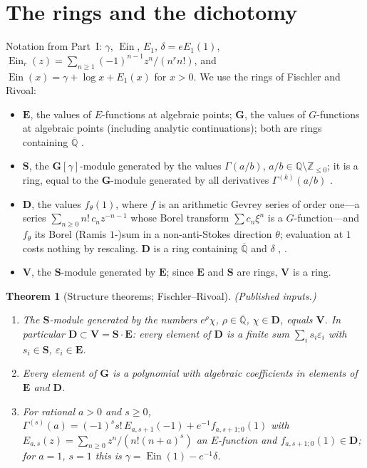 \documentclass[11pt,a4paper]{article}
\newcommand{\Q}{\mathbb Q}
\newcommand{\Z}{\mathbb Z}
\newcommand{\Qbar}{\overline{\mathbb Q}}
\newcommand{\Ein}{\operatorname{Ein}}
\newcommand{\EE}{\mathbf E}
\newcommand{\GG}{\mathbf G}
\newcommand{\DD}{\mathbf D}
\newcommand{\Sring}{\mathbf S}
\newcommand{\Vring}{\mathbf V}
\newtheorem{theorem}{Theorem}[section]
\theoremstyle{definition}
\theoremstyle{remark}
\numberwithin{equation}{section}
\begin{document}
\section{The rings and the dichotomy}\label{II:sec:setup}

Notation from Part~I: $\gamma$, $\Ein$, $E_1$, $\delta=eE_1(1)$,
$\Ein_r(z)=\sum_{n\ge1}(-1)^{n-1}z^n/(n^rn!)$, and
$\Ein(x)=\gamma+\log x+E_1(x)$ for $x>0$. We use the rings of Fischler and Rivoal:
\begin{itemize}[leftmargin=*]
\item $\EE$, the values of $E$-functions at algebraic points; $\GG$, the values of
$G$-functions at algebraic points (including analytic continuations); both are rings
containing $\Qbar$ \cite{FR2016,FR2014}.
\item $\Sring$, the $\GG[\gamma]$-module generated by the values $\Gamma(a/b)$,
$a/b\in\Q\setminus\Z_{\le0}$; it is a ring, equal to the $\GG$-module generated by all
derivatives $\Gamma^{(k)}(a/b)$ \cite[\S1]{FR2016}.
\item $\DD$, the values $f_\theta(1)$, where $f$ is an arithmetic Gevrey series of order
one---a series $\sum_{n\ge0}n!\,c_nz^{-n-1}$ whose Borel transform $\sum c_n\xi^n$ is a
$G$-function---and $f_\theta$ its Borel (Ramis $1$-)sum in a non-anti-Stokes direction
$\theta$; evaluation at $1$ costs nothing by rescaling. $\DD$ is a ring containing $\Qbar$
and $\delta$ \cite[\S1]{FRmixed}, \cite[\S4]{FR2018}.
\item $\Vring$, the $\Sring$-module generated by $\EE$; since $\EE$ and $\Sring$ are rings,
$\Vring$ is a ring.
\end{itemize}

\begin{theorem}[Structure theorems; Fischler--Rivoal]\label{II:thm:FR2018}
\textup{(Published inputs.)}
\begin{enumerate}[label=(\roman*)]
\item \cite[Thm.~3]{FR2018} The $\Sring$-module generated by the numbers
$e^{\rho}\chi$, $\rho\in\Qbar$, $\chi\in\DD$, equals $\Vring$. In particular
$\DD\subset\Vring=\Sring\cdot\EE$: every element of $\DD$ is a finite sum
$\sum_i s_i\varepsilon_i$ with $s_i\in\Sring$, $\varepsilon_i\in\EE$.
\item \cite[Thm.~1]{FRmixed} Every element of $\GG$ is a polynomial with algebraic
coefficients in elements of $\EE$ and $\DD$.
\item \cite[eqs.~(4.4)--(4.5)]{FRmixed} For rational $a>0$ and $s\ge0$,
$\Gamma^{(s)}(a)=(-1)^ss!\,E_{a,s+1}(-1)+e^{-1}f_{a,s+1;0}(1)$ with
$E_{a,s}(z)=\sum_{n\ge0}z^n/(n!(n+a)^s)$ an $E$-function and $f_{a,s+1;0}(1)\in\DD$; for
$a=1$, $s=1$ this is $\gamma=\Ein(1)-e^{-1}\delta$.
\end{enumerate}
\end{theorem}
\end{document}
